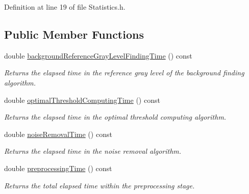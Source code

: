 Definition at line 19 of file Statistics.h.\subsection*{Public Member Functions}
\begin{CompactItemize}
\item 
double \hyperlink{class_statistics_565e90b1940d12bb2a2661f6dcea230d}{backgroundReferenceGrayLevelFindingTime} () const 
\begin{CompactList}\small\item\em Returns the elapsed time in the reference gray level of the background finding algorithm. \item\end{CompactList}\item 
double \hyperlink{class_statistics_ca10ccbc4137e9ad184ff6dc9a3e5a46}{optimalThresholdComputingTime} () const 
\begin{CompactList}\small\item\em Returns the elapsed time in the optimal threshold computing algorithm. \item\end{CompactList}\item 
double \hyperlink{class_statistics_25b35c7f7f33d55ee86f4e7ba6cd0c48}{noiseRemovalTime} () const 
\begin{CompactList}\small\item\em Returns the elapsed time in the noise removal algorithm. \item\end{CompactList}\item 
double \hyperlink{class_statistics_d88deb57349fedd7035ccffa06b4859b}{preprocessingTime} () const 
\begin{CompactList}\small\item\em Returns the total elapsed time within the preprocessing stage. \item\end{CompactList}\end{CompactItemize}
